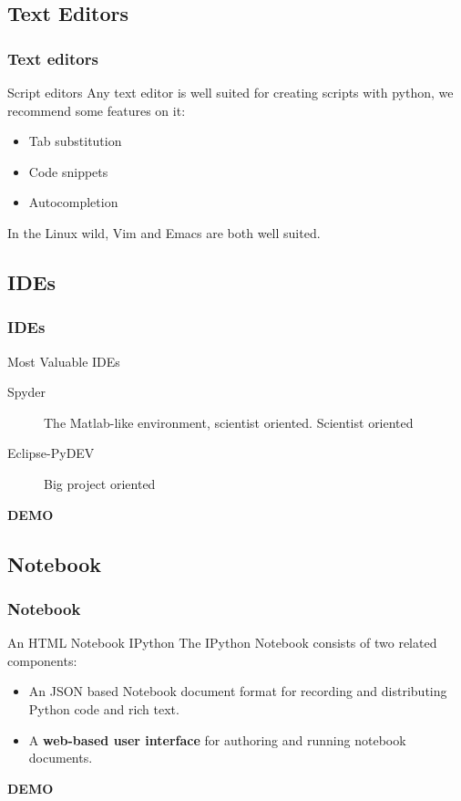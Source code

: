 \documentclass[colorlinks]{beamer}
\begin{document}
\subsection{Text Editors} %
\begin{frame}[fragile]\frametitle{Text editors}
\begin{block}{Script editors}
 Any text editor is well suited for creating scripts with python, we recommend some features on it:
\begin{itemize}
    \item Tab substitution
    \item Code snippets
    \item Autocompletion
\end{itemize}
In the Linux wild, Vim and Emacs are both well suited.
\end{block}

\end{frame}

\subsection{IDEs}
\begin{frame}[fragile]\frametitle{IDEs}
 \begin{block}{Most Valuable IDEs}
 \begin{description}
     \item[Spyder] The Matlab-like environment, scientist oriented.
Scientist oriented
     \item[Eclipse-PyDEV] Big project oriented  
 \end{description}
 \end{block}
\begin{center}
    \textbf{DEMO}
\end{center}

\end{frame}

\subsection{Notebook}
\begin{frame}[fragile]\frametitle{Notebook}
\begin{block}{An HTML Notebook IPython}
The IPython Notebook consists of two related components:
\begin{itemize}
    \item An JSON based Notebook document format for recording and distributing Python code and rich text.
\item A \textbf{web-based user interface} for authoring and running notebook documents.
\end{itemize}
\end{block}
\begin{center}
    \textbf{DEMO}
\end{center}
\end{frame}
\end{document}
